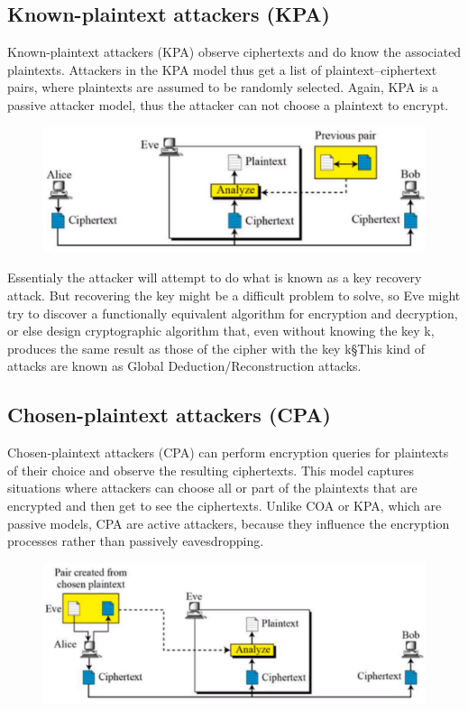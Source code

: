 	
	\subsection{Known-plaintext attackers (KPA)}
	Known-plaintext attackers (KPA) observe ciphertexts and do know the associated plaintexts. Attackers in the KPA model thus get a list of plaintext–ciphertext pairs, where plaintexts are assumed to be randomly selected. Again, KPA is a passive attacker model, thus the attacker can not choose a plaintext to encrypt.
	\begin{figure}
		\centering
		\includegraphics[width=0.7\linewidth]{Images/Chapter1/screenshot002}
		\caption{}
		\label{fig:screenshot002}
	\end{figure}
	
	Essentialy the attacker will attempt to do what is known as a key recovery attack. But recovering the key might be a difficult problem to solve, so Eve might try to discover a functionally equivalent algorithm for encryption and decryption, or else design cryptographic algorithm that, even without knowing the key k, produces the same result as those of the cipher with the key k§This kind of attacks are known as Global Deduction/Reconstruction attacks.
	
	\subsection{Chosen-plaintext attackers (CPA)}
	Chosen-plaintext attackers (CPA) can perform encryption queries for	plaintexts of their choice and observe the resulting ciphertexts. This model captures situations where attackers can choose all or part of the plaintexts that are encrypted and then get to see the ciphertexts.
	Unlike COA or KPA, which are passive models, CPA are active attackers, because they influence the encryption processes rather than passively eavesdropping.
	
	\begin{figure}
		\centering
		\includegraphics[width=0.7\linewidth]{Images/Chapter1/screenshot003}
		\caption{}
		\label{fig:screenshot003}
	\end{figure}
	

